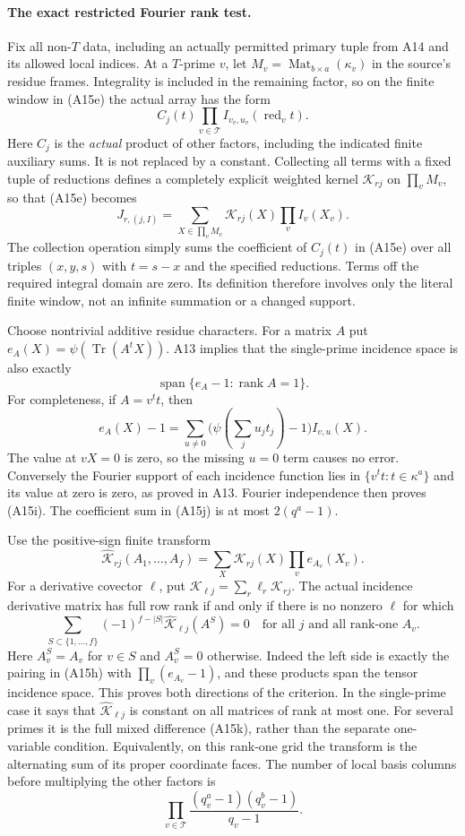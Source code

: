 \documentclass[11pt]{article}
\theoremstyle{definition}\newtheorem{definition}[theorem]{Definition}\newtheorem{remark}[theorem]{Remark}
\begin{document}
\paragraph{The exact restricted Fourier rank test.}
Fix all non-$T$ data, including an actually permitted primary tuple
from A14 and its allowed local indices.  At a $T$-prime $v$, let
$M_v=\operatorname{Mat}_{b\times a}(\kappa_v)$ in the source's residue
frames.  Integrality is included in the remaining factor, so on the
finite window in (A15e) the actual array has the form
\[
 C_j(t)\prod_{v\in\mathcal T}I_{v_v,u_v}(\operatorname{red}_v t).
 \tag{A15g}
\]
Here $C_j$ is the \emph{actual} product of other factors, including
the indicated finite auxiliary sums.  It is not replaced by a
constant.  Collecting all terms with a fixed tuple of reductions
defines a completely explicit weighted kernel
$\mathcal K_{rj}$ on $\prod_v M_v$, so that (A15e) becomes
\[
 J_{r,(j,I)}=\sum_{X\in\prod_v M_v}
                    \mathcal K_{rj}(X)\prod_v I_v(X_v).
 \tag{A15h}
\]
The collection operation simply sums the coefficient of
$C_j(t)$ in (A15e) over all triples $(x,y,s)$ with $t=s-x$ and
the specified reductions.  Terms off the required integral domain
are zero.  Its definition therefore involves only the literal
finite window, not an infinite summation or a changed support.

Choose nontrivial additive residue characters.  For a matrix $A$
put $e_A(X)=\psi(\operatorname{Tr}(A^tX))$.  A13 implies that the
single-prime incidence space is also exactly
\[
 \operatorname{span}\{e_A-1:\operatorname{rank}A=1\}.
 \tag{A15i}
\]
For completeness, if $A=v^tt$, then
\[
 e_A(X)-1
       =\sum_{u\ne0}\bigl(\psi(\textstyle\sum_j u_jt_j)-1\bigr)I_{v,u}(X).
 \tag{A15j}
\]
The value at $vX=0$ is zero, so the missing $u=0$ term causes no
error.  Conversely the Fourier support of each incidence function
lies in $\{v^tt:t\in\kappa^a\}$ and its value at zero is zero,
as proved in A13.  Fourier independence then proves (A15i).
The coefficient sum in (A15j) is at most $2(q^a-1)$.

Use the positive-sign finite transform
\[
 \widehat{\mathcal K}_{rj}(A_1,\ldots,A_f)
   =\sum_X\mathcal K_{rj}(X)\prod_v e_{A_v}(X_v).
\]
For a derivative covector $\ell$, put
$\mathcal K_{\ell j}=\sum_r\ell_r\mathcal K_{rj}$.
The actual incidence derivative matrix has full row rank if and
only if there is no nonzero $\ell$ for which
\[
 \sum_{S\subset\{1,\ldots,f\}}(-1)^{f-|S|}
       \widehat{\mathcal K}_{\ell j}(A^S)=0
 \quad\text{for all }j\text{ and all rank-one }A_v.
 \tag{A15k}
\]
Here $A^S_v=A_v$ for $v\in S$ and $A^S_v=0$ otherwise.
Indeed the left side is exactly the pairing in (A15h) with
$\prod_v(e_{A_v}-1)$, and these products span the tensor incidence
space.  This proves both directions of the criterion.  In the
single-prime case it says that
$\widehat{\mathcal K}_{\ell j}$ is constant on all matrices of rank
at most one.  For several primes it is the full mixed difference
(A15k), rather than the separate one-variable condition.
Equivalently, on this rank-one grid the transform is the alternating
sum of its proper coordinate faces.  The number of local basis
columns before multiplying the other factors is
\[
       \prod_{v\in\mathcal T}
       \frac{(q_v^a-1)(q_v^b-1)}{q_v-1}.
 \tag{A15l}
\]
\end{document}
